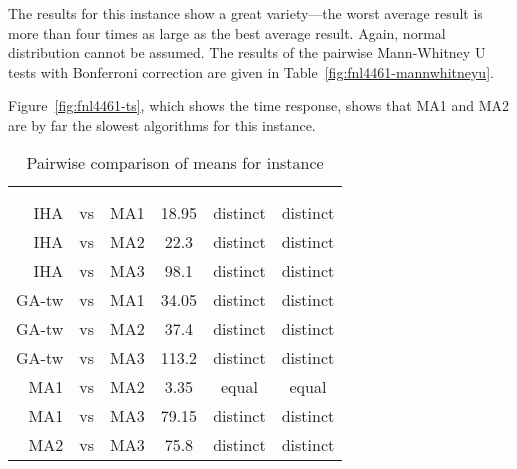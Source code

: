 \documentclass[thesis.tex]{subfiles}
\begin{document}
\subsubsection{}
   \renewcommand{\CurrentInstance}{\Instance{fnl4461}}
   \renewcommand{\CurrentInstanceFileEscaped}{fnl4461}
   \renewcommand{\CurrentInstanceTexEscaped}{fnl4461}



The results for this instance show a great variety---the worst average result is more than four times as large as the best average result. Again, normal distribution cannot be assumed. The results of the pairwise Mann-Whitney U tests with Bonferroni correction are given in Table~\vref{fig:fnl4461-mannwhitneyu}.

Figure~\vref{fig:fnl4461-ts}, which shows the time response, shows that \gls{MA1} and \gls{MA2} are by far the slowest algorithms for this instance.
\begin{table}[htbp]
   \caption{Pairwise comparison of means for instance \CurrentInstance}
   \label{fig:\CurrentInstanceFileEscaped-mannwhitneyu}
   \centering\small
      \begin{tabular}{r@{\ }c@{\ }l S[table-format=3.2] c c} \toprule
         &&&                          &  \\ \cmidrule(lr){5-6}
         &&&  &  &  \\ \midrule

         \gls{IHA} &vs& \gls{MA1}   &  18.95 & distinct & distinct \\
         \gls{IHA} &vs& \gls{MA2}   &  22.3  & distinct & distinct \\
         \gls{IHA} &vs& \gls{MA3}   &  98.1  & distinct & distinct \\
         \gls{GA-tw} &vs& \gls{MA1} &  34.05 & distinct & distinct \\
         \gls{GA-tw} &vs& \gls{MA2} &  37.4  & distinct & distinct \\
         \gls{GA-tw} &vs& \gls{MA3} & 113.2  & distinct & distinct \\
         \gls{MA1} &vs& \gls{MA2}   &   3.35 &  equal   &  equal   \\
         \gls{MA1} &vs& \gls{MA3}   &  79.15 & distinct & distinct \\
         \gls{MA2} &vs& \gls{MA3}   &  75.8  & distinct & distinct \\
         \bottomrule
      \end{tabular}
\end{table}
\end{document}

